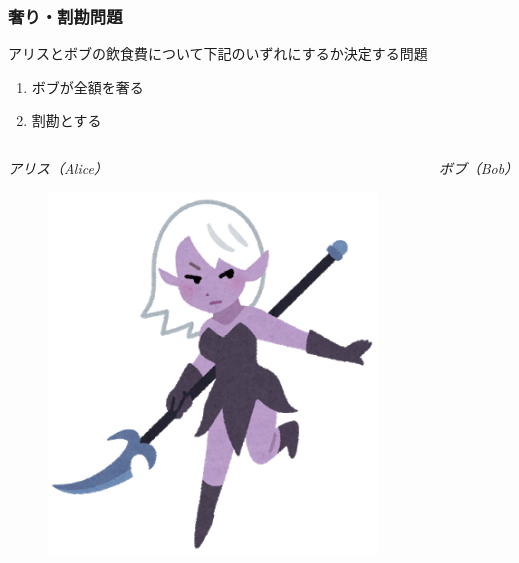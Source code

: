 \begin{frame}
  \frametitle{奢り・割勘問題}

  \begin{shadequote}[r]{}
    \begin{center}
      アリスとボブの飲食費について下記のいずれにするか決定する問題
      \begin{enumerate}
        \item ボブが全額を奢る
        \item 割勘とする
      \end{enumerate}
    \end{center}
  \end{shadequote}

  \begin{columns}
    \begin{column}{0.5\textwidth}
      \centering
      \emph{アリス（Alice）}

      \begin{figure}[h]
        \includegraphics[height=0.4\textheight]{img/alice.png}
      \end{figure}
    \end{column}
   
    \begin{column}{0.5\textwidth}
      \centering
      \emph{ボブ（Bob）}


\end{column}
\end{columns}
\end{frame}
